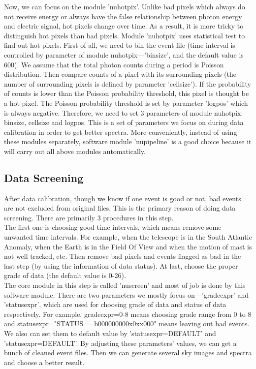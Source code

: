 \documentclass[12pt]{report}
\begin{document}
        \vspace{2cm}
        \noindent Now, we can focus on the module 'nuhotpix'. Unlike bad pixels which always do not receive energy 
        or always have the false relationship between photon energy and electric signal, hot pixels change over time.
        As a result, it is more tricky to distinguish hot pixels than bad pixels. Module 'nuhotpix' uses statistical
        test to find out hot pixels. First of all, we need to bin the event file (time interval is controlled by 
        parameter of module nuhotpix---'binsize', and the default value is 600). We assume that the total photon 
        counts during a period is Poisson distribution. Then compare counts of a pixel with its surrounding
        pixels (the number of surrounding pixels is defined by parameter 'cellsize'). If the probability of counts
        is lower than the Poisson probability threshold, this pixel is thought be a hot pixel. The Poisson 
        probability threshold is set by parameter 'logpos' which is always negative. Therefore, we need to set 
        3 parameters of module nuhotpix: binsize, cellsize and logpos. This is a set of parameters we focus on
        during data calibration in order to get better spectra. More conveniently, instead of using these modules
        separately, software module 'nupipeline' is a good choice because it will carry out all above modules 
        automatically. 
    
    \subsection{Data Screening}  
        After data calibration, though we know if one event is good or not, bad events are not excluded from original
        files. This is the primary reason of doing data screening. There are primarily 3 procedures in this step.\\
        \indent The first one is choosing good time intervals, which means remove some unwanted time intervals. For 
        example, when the telescope is in the South Atlantic Anomaly, when the Earth is in the Field Of View and 
        when the motion of mast is not well tracked, etc. Then remove bad pixels and events flagged as bad in the 
        last step (by using the information of data status). At last, choose the proper grade of data 
        (the default value is 0-26). \\
        \indent The core module in this step is called 'nuscreen' and most of job is done by this software module.  
        There are two parameters we mostly focus on---'gradeexpr' and 'statusexpr', which are used for choosing 
        grade of data and status of data respectively. For example, gradeexpr=0-8 means choosing grade range 
        from 0 to 8 and statusexpr="STATUS==b000000000x0xx000" means leaving out bad events. We also can set  
        them to default value by 'statusexpr=DEFAULT' and 'statusexpr=DEFAULT'. By adjusting these parameters' 
        values, we can get a bunch of cleaned event files. Then we can generate several sky images and spectra and 
        choose a better result. 
\end{document}
